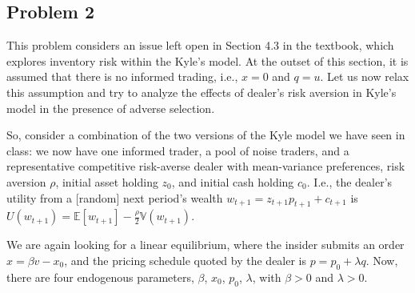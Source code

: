 \documentclass[11pt
, answers
]{exam}
\begin{document}
\qquad
\subsection*{Problem 2}


This problem considers an issue left open in Section 4.3 in the textbook, which explores inventory risk within the Kyle's model. At the outset of this section, it is assumed that there is no informed trading, i.e., $x = 0$ and $q = u$. Let us now relax this assumption and try to analyze the effects of dealer's risk aversion in Kyle's model in the presence of adverse selection.

So, consider a combination of the two versions of the Kyle model we have seen in class: we now have one informed trader, a pool of noise traders, and a representative competitive risk-averse dealer with mean-variance preferences, risk aversion $\rho$, initial asset holding $z_{0}$, and initial cash holding $c_{0}$. I.e., the dealer's utility from a [random] next period's wealth $w_{t+1} = z_{t+1}p_{t+1} + c_{t+1}$ is $U(w_{t+1}) = \mathbb{E}[w_{t+1}] - \frac{\rho}{2} \mathbb{V}(w_{t+1})$.

We are again looking for a linear equilibrium, where the insider submits an order $x = \beta v - x_{0}$, and the pricing schedule quoted by the dealer is $p = p_{0}+\lambda q$. Now, there are four endogenous parameters, $\beta$, $x_{0}$, $p_{0}$, $\lambda$, with $\beta>0$ and $\lambda>0$.
\end{document}
